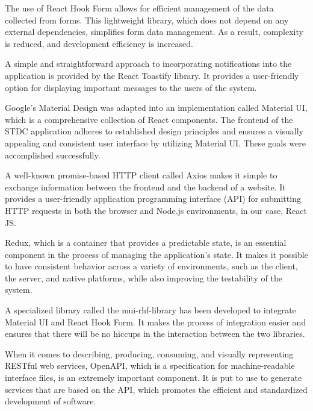 \begin{justify}
        \vspace{0.25cm}
        \newendline The use of React Hook Form allows for efficient management of the data collected from forms. This lightweight library, which does not depend on any external dependencies, simplifies form data management. As a result, complexity is reduced, and development efficiency is increased.
        
        \vspace{0.25cm}
        \newendline A simple and straightforward approach to incorporating notifications into the application is provided by the React Toastify library. It provides a user-friendly option for displaying important messages to the users of the system.
        
        \vspace{0.25cm}
        \newendline Google's Material Design was adapted into an implementation called Material UI, which is a comprehensive collection of React components. The frontend of the STDC application adheres to established design principles and ensures a visually appealing and consistent user interface by utilizing Material UI. These goals were accomplished successfully.
        
        \vspace{0.25cm}
        \newendline A well-known promise-based HTTP client called Axios makes it simple to exchange information between the frontend and the backend of a website. It provides a user-friendly application programming interface (API) for submitting HTTP requests in both the browser and Node.js environments, in our case, React JS.
        
        \vspace{0.25cm}
        \newendline Redux, which is a container that provides a predictable state, is an essential component in the process of managing the application's state. It makes it possible to have consistent behavior across a variety of environments, such as the client, the server, and native platforms, while also improving the testability of the system.
        
        \vspace{0.25cm}
        \newendline A specialized library called the mui-rhf-library has been developed to integrate Material UI and React Hook Form. It makes the process of integration easier and ensures that there will be no hiccups in the interaction between the two libraries.
        
        \vspace{0.25cm}
        \newendline When it comes to describing, producing, consuming, and visually representing RESTful web services, OpenAPI, which is a specification for machine-readable interface files, is an extremely important component. It is put to use to generate services that are based on the API, which promotes the efficient and standardized development of software.
        

\end{justify}
